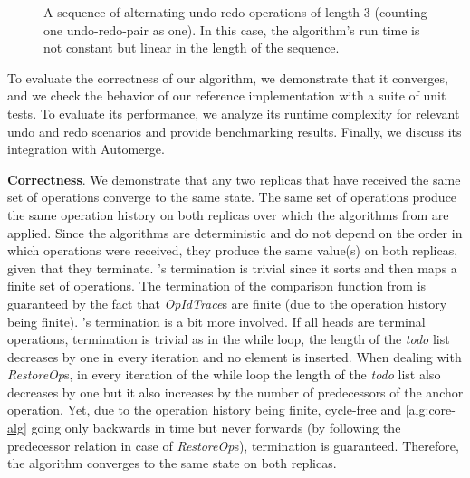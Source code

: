 \documentclass[sigplan,natbib=false,review]{acmart}
\newcommand{\setop}[4][set]{$\mathit{#1_{#2}^{#3}}{(#4)}$}
\newcommand{\undop}[5][undo]{$\mathit{#1_{#2}^{#3}}{(_{#4}^{#5})}$}
\newcommand{\redop}[5][redo]{$\mathit{#1_{#2}^{#3}}{(_{#4}^{#5})}$}
\newcommand{\restopkind}{\textit{RestoreOp}}
\newcommand{\opidtrace}{\textit{OpIdTrace}}
\begin{document}
\begin{figure*}[ht!]
\centering
{}
\caption{
  A sequence of alternating undo-redo operations
  of length $3$ (counting one undo-redo-pair as one).
  In this case, the algorithm's run time is not constant but linear
  in the length of the sequence.
}\label{fig:degenerate-op-sequence}
\end{figure*}

To evaluate the correctness of our algorithm, we demonstrate that it converges,
and we check the behavior of our reference implementation with a suite of unit tests.
To evaluate its performance, we analyze its runtime complexity for relevant
undo and redo scenarios and provide benchmarking results.
Finally, we discuss its integration with Automerge.

\textbf{Correctness}.
We demonstrate that any two replicas that have received the same set of
operations converge to the same state.
The same set of operations produce the same operation history on both
replicas over which the algorithms from  are applied.
Since the algorithms are deterministic and do not depend on the order in which
operations were received, they produce the same value(s) on both
replicas, given that they terminate.
's termination is trivial since it sorts and then
maps a finite set of operations.
The termination of the comparison function from  is
guaranteed by the fact that \opidtrace{}s are finite
(due to the operation history being finite).
's termination is a bit more involved.
If all heads are terminal operations, termination is trivial as in the 
while loop, the length of the \textit{todo} list decreases by one in every iteration
and no element is inserted.
When dealing with \restopkind{}s, in every iteration of the while loop
the length of the \textit{todo} list also decreases by one but it also 
increases by the number of predecessors of the anchor operation.
Yet, due to the operation history being finite, cycle-free and \autoref{alg:core-alg}
going only backwards in time but never forwards
(by following the predecessor relation in case of \restopkind{}s),
termination is guaranteed.
Therefore, the algorithm converges to the same state on both replicas.
\end{document}
